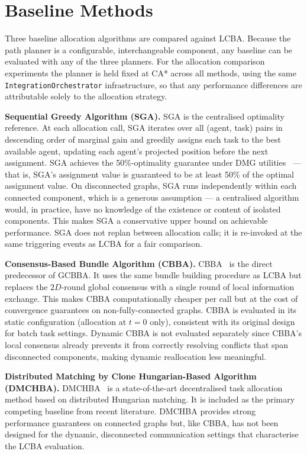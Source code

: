 \section{Baseline Methods}
\label{sec:method_baselines}

Three baseline allocation algorithms are compared against LCBA.
Because the path planner is a configurable, interchangeable component, any
baseline can be evaluated with any of the three planners.
For the allocation comparison experiments the planner is held fixed at CA*
across all methods, using the same \texttt{IntegrationOrchestrator}
infrastructure, so that any performance differences are attributable solely to
the allocation strategy.

\textbf{Sequential Greedy Algorithm (SGA).}
SGA is the centralised optimality reference.
At each allocation call, SGA iterates over all (agent, task) pairs in
descending order of marginal gain and greedily assigns each task to the best
available agent, updating each agent's projected position before the next
assignment.
SGA achieves the 50\%-optimality guarantee under DMG
utilities~\cite{fisher1978analysis} --- that is, SGA's assignment value is
guaranteed to be at least 50\% of the optimal assignment value.
On disconnected graphs, SGA runs independently within each connected component,
which is a generous assumption --- a centralised algorithm would, in practice,
have no knowledge of the existence or content of isolated components.
This makes SGA a conservative upper bound on achievable performance.
SGA does not replan between allocation calls; it is re-invoked at the same
triggering events as LCBA for a fair comparison.

\textbf{Consensus-Based Bundle Algorithm (CBBA).}
CBBA~\cite{choi2009consensus} is the direct predecessor of GCBBA.
It uses the same bundle building procedure as LCBA but replaces the $2D$-round
global consensus with a single round of local information exchange.
This makes CBBA computationally cheaper per call but at the cost of convergence
guarantees on non-fully-connected graphs.
CBBA is evaluated in its static configuration (allocation at $t=0$ only),
consistent with its original design for batch task settings.
Dynamic CBBA is not evaluated separately since CBBA's local consensus already
prevents it from correctly resolving conflicts that span disconnected components,
making dynamic reallocation less meaningful.

\textbf{Distributed Matching by Clone Hungarian-Based Algorithm (DMCHBA).}
DMCHBA~\cite{samiei2024dmchba} is a state-of-the-art decentralised task
allocation method based on distributed Hungarian matching.
It is included as the primary competing baseline from recent literature.
DMCHBA provides strong performance guarantees on connected graphs but, like
CBBA, has not been designed for the dynamic, disconnected communication
settings that characterise the LCBA evaluation.


